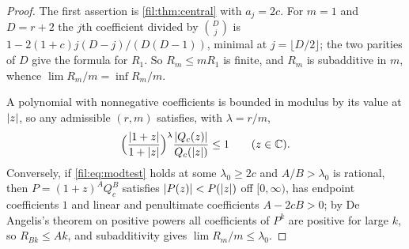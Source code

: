 \begin{proof}
The first assertion is \cref{fil:thm:central} with $a_j=2c$. For $m=1$ and $D=r+2$ the $j$th coefficient divided
by $\binom Dj$ is $1-2(1+c)j(D-j)/(D(D-1))$, minimal at $j=\lfloor D/2\rfloor$; the two parities of $D$ give the
formula for $R_1$. So $R_m\le mR_1$ is finite, and $R_m$ is subadditive in $m$, whence
$\lim R_m/m=\inf R_m/m$.

A polynomial with nonnegative coefficients is bounded in modulus by its value at $\lvert z\rvert$, so any admissible
$(r,m)$ satisfies, with $\lambda=r/m$,
\begin{equation}\label{fil:eq:modtest}
 \Bigl(\frac{\lvert1+z\rvert}{1+\lvert z\rvert}\Bigr)^\lambda\frac{\lvert Q_c(z)\rvert}{Q_c(\lvert z\rvert)}\le1\qquad(z\in\mathbb{C}).
\end{equation}
Conversely, if \eqref{fil:eq:modtest} holds at some $\lambda_0\ge2c$ and $A/B>\lambda_0$ is rational, then
$P=(1+z)^AQ_c^B$ satisfies $\lvert P(z)\rvert<P(\lvert z\rvert)$ off $[0,\infty)$, has endpoint coefficients $1$ and linear and
penultimate coefficients $A-2cB>0$; by De Angelis's theorem on positive powers \cite{DeAngelis2003Asymptotic}
all coefficients of $P^k$ are positive for large $k$, so $R_{Bk}\le Ak$, and subadditivity gives
$\lim R_m/m\le\lambda_0$.


\end{proof}

